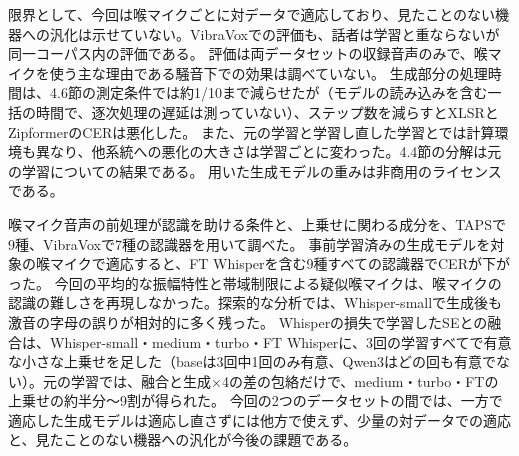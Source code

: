 \documentclass[xelatex,ja=standard,a4paper,twocolumn,10pt]{bxjsarticle}
\makeatletter
\renewcommand{\section}{\@startsection{section}{1}{\z@}{1.0ex plus .3ex}{.5ex}{\normalfont\large\sffamily\bfseries}}
\makeatother
\begin{document}
限界として、今回は喉マイクごとに対データで適応しており、見たことのない機器への汎化は示せていない。VibraVoxでの評価も、話者は学習と重ならないが同一コーパス内の評価である。
評価は両データセットの収録音声のみで、喉マイクを使う主な理由である騒音下での効果は調べていない。
生成部分の処理時間は、4.6節の測定条件では約1/10まで減らせたが（モデルの読み込みを含む一括の時間で、逐次処理の遅延は測っていない）、ステップ数を減らすとXLSRとZipformerのCERは悪化した。
また、元の学習と学習し直した学習とでは計算環境も異なり、他系統への悪化の大きさは学習ごとに変わった。4.4節の分解は元の学習についての結果である。
用いた生成モデルの重みは非商用のライセンスである。

\section{まとめ}
喉マイク音声の前処理が認識を助ける条件と、上乗せに関わる成分を、TAPSで9種、VibraVoxで7種の認識器を用いて調べた。
事前学習済みの生成モデルを対象の喉マイクで適応すると、FT Whisperを含む9種すべての認識器でCERが下がった。
今回の平均的な振幅特性と帯域制限による疑似喉マイクは、喉マイクの認識の難しさを再現しなかった。探索的な分析では、Whisper-smallで生成後も激音の字母の誤りが相対的に多く残った。
Whisperの損失で学習したSEとの融合は、Whisper-small・medium・turbo・FT Whisperに、3回の学習すべてで有意な小さな上乗せを足した（baseは3回中1回のみ有意、Qwen3はどの回も有意でない）。元の学習では、融合と生成×4の差の包絡だけで、medium・turbo・FTの上乗せの約半分〜9割が得られた。
今回の2つのデータセットの間では、一方で適応した生成モデルは適応し直さずには他方で使えず、少量の対データでの適応と、見たことのない機器への汎化が今後の課題である。

\footnotesize
\let\oldbibitem\bibitem
\renewcommand{\bibitem}{\setlength{\itemsep}{0pt}\setlength{\parsep}{0pt}\oldbibitem}


\end{document}
